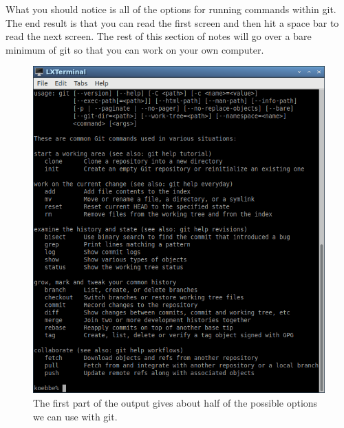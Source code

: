 \documentclass[10pt,fleqn]{article}
\begin{document}
What you should notice is all of the options for running commands within git.
The end result is that you can read the first screen and then hit a space bar
to read the next screen. The rest of this section of notes will go over a bare
minimum of git so that you can work on your own computer.
\vfill
\begin{figure}[h]
\centering
\includegraphics{../images/git_02.png}
\vskip0.1in
\caption{The first part of the output gives about half of the possible options
         we can use with git.}
\end{figure}
\vfill
\end{document}
